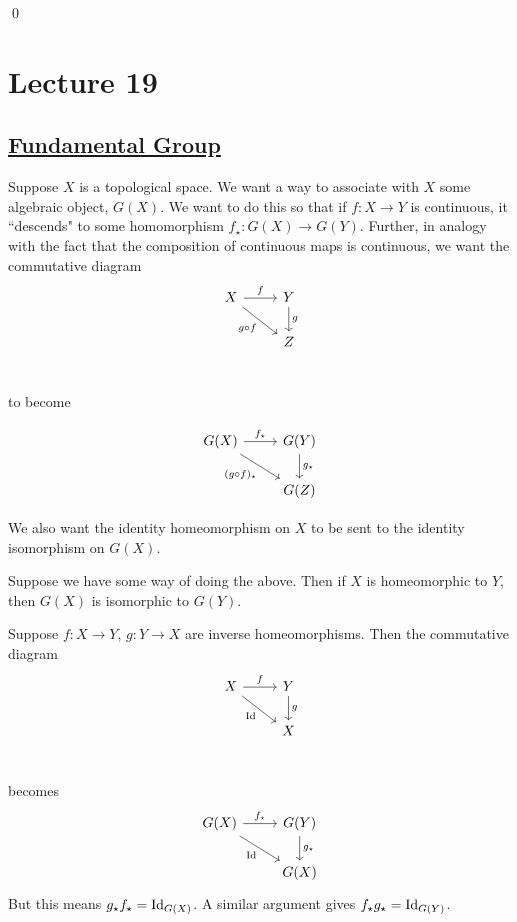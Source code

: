 \documentclass[x11names,reqno,14pt]{extarticle}
\begin{document}
\qed

\section*{Lecture 19}

\subsection*{\underline{Fundamental Group}}

Suppose $X$ is a topological space. We want a way to associate with $X$ some algebraic object, $G(X)$. We want to do this so that if $f:X\to Y$ is continuous, it ``descends" to some homomorphism $f_\star:G(X)\to G(Y)$. Further, in analogy with the fact that the composition of continuous maps is continuous, we want the commutative diagram 
\[
\begin{tikzcd}
X \ar[rd, "g \circ f"'] \ar[r, "f"] & Y \ar[d, "g"] \\
& Z \\
\end{tikzcd}
\]

to become

\[
\begin{tikzcd}
G(X) \ar[rd, "(g \circ f)_\star"'] \ar[r, "f_\star"] & G(Y) \ar[d, "g_\star"] \\
& G(Z)
\end{tikzcd}
\]

We also want the identity homeomorphism on $X$ to be sent to the identity isomorphism on $G(X)$. 

\thm 

Suppose we have some way of doing the above. Then if $X$ is homeomorphic to $Y$, then $G(X)$ is isomorphic to $G(Y)$. 

\proof

Suppose $f:X\to Y$, $g:Y\to X$ are inverse homeomorphisms. Then the commutative diagram
\[
\begin{tikzcd}
X \ar[rd, "\Id"'] \ar[r, "f"] & Y \ar[d, "g"] \\
& X \\
\end{tikzcd}
\]

becomes
\[
\begin{tikzcd}
G(X) \ar[rd, "\Id"'] \ar[r, "f_\star"] & G(Y) \ar[d, "g_\star"] \\
& G(X)
\end{tikzcd}
\]
But this means $g_\star f_\star = \operatorname{\mathrm{Id}}_{G(X)}$. A similar argument gives $f_\star g_\star = \operatorname{\mathrm{Id}}_{G(Y)}$. 
\end{document}
